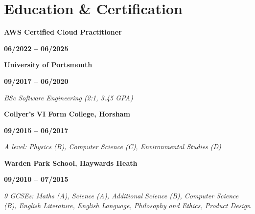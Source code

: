 \documentclass[12pt]{article}
\newcommand{\education}[3]{

  \noindent  \textbf{#1}
    \hfill 
    \parbox{9em}{%
    \centering\textbf{#2}} \par
    \vspace*{0.5em} 
     \noindent \textit{#3} \par
     \vspace*{1em}
\normalsize \par}
\begin{document}
\section*{Education \& Certification}

\education{AWS Certified Cloud Practitioner} {06/2022 -- 06/2025} {}
\education{University of Portsmouth} {09/2017 -- 06/2020} {BSc Software Engineering (2:1, 3.45 GPA)} 
\education{Collyer's VI Form College, Horsham} {09/2015 -- 06/2017} {A level: Physics (B), Computer Science (C), Environmental Studies (D)}
\education{Warden Park School, Haywards Heath} {09/2010 -- 07/2015} {9 GCSEs: Maths (A), Science (A), Additional Science (B), Computer Science (B), English Literature, English Language, Philosophy and Ethics, Product Design} 
\end{document}
